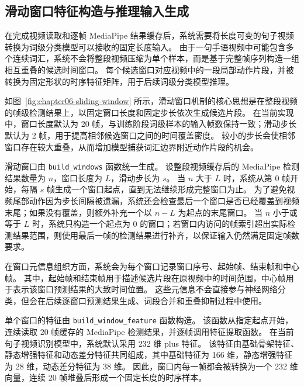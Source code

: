 
\subsection{滑动窗口特征构造与推理输入生成}

在完成视频读取和逐帧 MediaPipe 结果缓存后，系统需要将长度可变的句子视频转换为词级分类模型可以接收的固定长度输入。
由于一句手语视频中可能包含多个连续词汇，系统不会将整段视频压缩为单个样本，而是基于完整帧序列构造一组相互重叠的候选时间窗口。
每个候选窗口对应视频中的一段局部动作片段，并被转换为固定形状的时序特征矩阵，用于后续词级分类模型推理。


如图~\ref{fig:chapter06-sliding-window} 所示，滑动窗口机制的核心思想是在整段视频的帧级检测结果上，以固定窗口长度和固定步长依次生成候选片段。
在当前实现中，窗口长度默认为 20 帧，与训练阶段词级样本的输入帧数保持一致；滑动步长默认为 2 帧，用于提高相邻候选窗口之间的时间覆盖密度。
较小的步长会使相邻窗口存在较大重叠，从而增加模型捕获词汇边界附近动作片段的机会。

滑动窗口由 \texttt{build\_windows} 函数统一生成。
设整段视频缓存后的 MediaPipe 检测结果数量为 $n$，窗口长度为 $L$，滑动步长为 $s$。
当 $n$ 大于 $L$ 时，系统从第 0 帧开始，每隔 $s$ 帧生成一个窗口起点，直到无法继续形成完整窗口为止。
为了避免视频尾部动作因为步长间隔被遗漏，系统还会检查最后一个窗口是否已经覆盖到视频末尾；如果没有覆盖，则额外补充一个以 $n-L$ 为起点的末尾窗口。
当 $n$ 小于或等于 $L$ 时，系统只构造一个起点为 0 的窗口；若窗口内访问的帧索引超出实际检测结果范围，则使用最后一帧的检测结果进行补齐，以保证输入仍然满足固定帧数要求。

在窗口元信息组织方面，系统会为每个窗口记录窗口序号、起始帧、结束帧和中心帧。
其中，起始帧和结束帧用于描述候选片段在原视频中的时间范围，中心帧用于表示该窗口预测结果的大致时间位置。
这些元信息不会直接参与神经网络分类，但会在后续逐窗口预测结果生成、词段合并和重叠抑制过程中使用。

单个窗口的特征由 \texttt{build\_window\_feature} 函数构造。
该函数从指定起点开始，连续读取 20 帧缓存的 MediaPipe 检测结果，并逐帧调用特征提取函数。
在当前句子视频识别模型中，系统默认采用 232 维 plus 特征。
该特征由基础骨架特征、静态增强特征和动态差分特征共同组成，其中基础特征为 166 维，静态增强特征为 28 维，动态差分特征为 38 维。
因此，窗口内每一帧都会被转换为一个 232 维向量，连续 20 帧堆叠后形成一个固定长度的时序样本。

